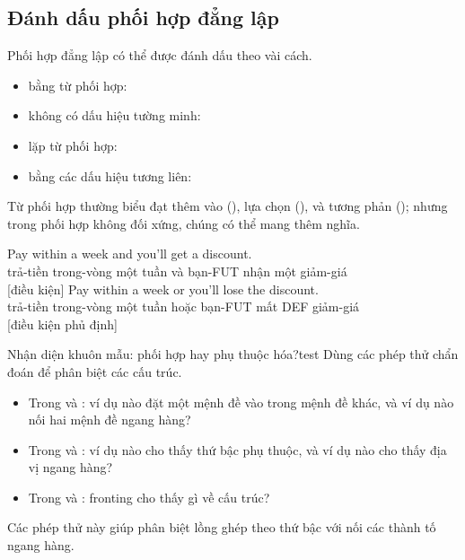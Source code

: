 \subsection{Đánh dấu phối hợp đẳng lập}

Phối hợp đẳng lập có thể được đánh dấu theo vài cách.
\begin{itemize}[noitemsep]
    \item bằng từ phối hợp: 
    \item không có dấu hiệu tường minh: 
    \item lặp từ phối hợp: 
    \item bằng các dấu hiệu tương liên: 
\end{itemize}

Từ phối hợp thường biểu đạt thêm vào (), lựa chọn (), và tương phản (); nhưng trong phối hợp không đối xứng, chúng có thể mang thêm nghĩa.

\ea \label{ex:coord-meaning-vi}
    \ea \gll Pay within a week and you'll get a discount.\\
        trả-tiền trong-vòng một tuần và bạn-FUT nhận một giảm-giá\\
    \glt {} [điều kiện]
    \ex \gll Pay within a week or you'll lose the discount.\\
        trả-tiền trong-vòng một tuần hoặc bạn-FUT mất DEF giảm-giá\\
    \glt {} [điều kiện phủ định]
    \z
\z

\begin{tblsframedsymbol}{Nhận diện khuôn mẫu: phối hợp hay phụ thuộc hóa?}{test}
Dùng các phép thử chẩn đoán để phân biệt các cấu trúc.
\begin{itemize}[noitemsep, leftmargin=*]
    \item Trong  và : ví dụ nào đặt một mệnh đề vào trong mệnh đề khác, và ví dụ nào nối hai mệnh đề ngang hàng?
    \item Trong  và : ví dụ nào cho thấy thứ bậc phụ thuộc, và ví dụ nào cho thấy địa vị ngang hàng?
    \item Trong  và : fronting cho thấy gì về cấu trúc?
\end{itemize}
Các phép thử này giúp phân biệt lồng ghép theo thứ bậc với nối các thành tố ngang hàng.
\end{tblsframedsymbol}

